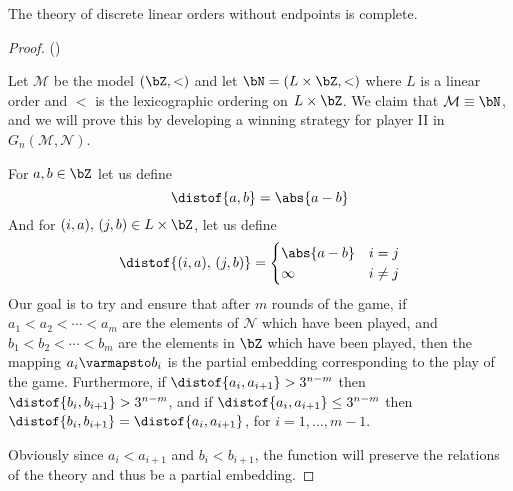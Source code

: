 \documentclass[10pt]{article}
\def\mM{\mathcal{M}}
\def\mN{\mathcal{N}}
\begin{document}
\newpage
\begin{prop*}

    The theory of discrete linear orders without endpoints is complete.

\end{prop*}

\begin{proof}

    ({})

    Let $\mM$ be the model $(\bZ,<)$ and let $\bN=(L\times\bZ,<)$ where $L$ is a linear order and $<$ is the lexicographic ordering on $L\times\bZ$.
    We claim that $\mM\equiv\bN$, and we will prove this by developing a winning strategy for player II in $G_n(\mM,\mN)$.

    For $a,b\in\bZ$ let us define
    \[ \distof{a,b} = \abs{a-b} \]
    And for $(i,a),\,(j,b)\in L\times\bZ$, let us define
    \[ \distof{(i,a),\,(j,b)} = \begin{cases} \abs{a-b} & i=j \\ \infty & i\neq j \end{cases} \]
    Our goal is to try and ensure that after $m$ rounds of the game, if $a_1<a_2<\cdots<a_m$ are the elements of $\mN$ which have been played, and $b_1<b_2<\cdots<b_m$ are the elements in $\bZ$ which have
    been played, then the mapping $a_i\varmapsto b_i$ is the partial embedding corresponding to the play of the game.
    Furthermore, if $\distof{a_i,a_{i+1}}>3^{n-m}$ then $\distof{b_i,b_{i+1}}>3^{n-m}$, and if $\distof{a_i,a_{i+1}}\leq3^{n-m}$ then $\distof{b_i,b_{i+1}}=\distof{a_i,a_{i+1}}$, for $i=1,\dots,m-1$.

    Obviously since $a_i<a_{i+1}$ and $b_i<b_{i+1}$, the function will preserve the relations of the theory and thus be a partial embedding.


\end{proof}
\end{document}
